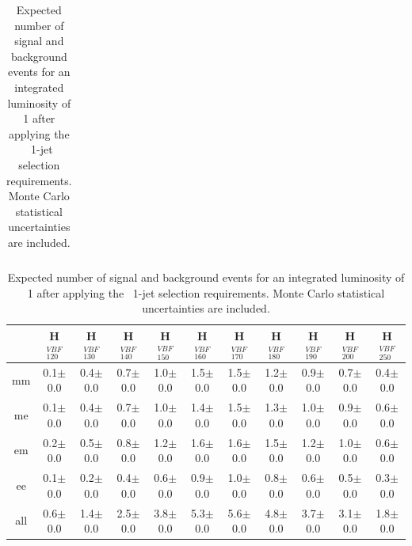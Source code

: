 \begin{table}[!ht]
\begin{center}
{\begin{tabular} {|c|c|c|c|c|c|c|c|c|c|c|}
 \hline
  \end{tabular}
  }
 {\small
  \begin{tabular} {|c|c|c|c|c|c|c|c|c|c|c|}
  \hline
     &   H$^{VBF}_{120}$ &  H$^{VBF}_{130}$ &    H$^{VBF}_{140}$ &   H$^{VBF}_{150}$ &   H$^{VBF}_{160}$ &   H$^{VBF}_{170}$ &   H$^{VBF}_{180}$ &   H$^{VBF}_{190}$ &   H$^{VBF}_{200}$ &   H$^{VBF}_{250}$ \\
  \hline
  \hline
  mm &  0.1$\pm$0.0 &  0.4$\pm$0.0 &  0.7$\pm$0.0 &  1.0$\pm$0.0 &  1.5$\pm$0.0 &  1.5$\pm$0.0 &  1.2$\pm$0.0 &  0.9$\pm$0.0 &  0.7$\pm$0.0 &  0.4$\pm$0.0 \\
  me &  0.1$\pm$0.0 &  0.4$\pm$0.0 &  0.7$\pm$0.0 &  1.0$\pm$0.0 &  1.4$\pm$0.0 &  1.5$\pm$0.0 &  1.3$\pm$0.0 &  1.0$\pm$0.0 &  0.9$\pm$0.0 &  0.6$\pm$0.0 \\
  em &  0.2$\pm$0.0 &  0.5$\pm$0.0 &  0.8$\pm$0.0 &  1.2$\pm$0.0 &  1.6$\pm$0.0 &  1.6$\pm$0.0 &  1.5$\pm$0.0 &  1.2$\pm$0.0 &  1.0$\pm$0.0 &  0.6$\pm$0.0 \\
  ee &  0.1$\pm$0.0 &  0.2$\pm$0.0 &  0.4$\pm$0.0 &  0.6$\pm$0.0 &  0.9$\pm$0.0 &  1.0$\pm$0.0 &  0.8$\pm$0.0 &  0.6$\pm$0.0 &  0.5$\pm$0.0 &  0.3$\pm$0.0 \\
  \hline
 all &  0.6$\pm$0.0 &  1.4$\pm$0.0 &  2.5$\pm$0.0 &  3.8$\pm$0.0 &  5.3$\pm$0.0 &  5.6$\pm$0.0 &  4.8$\pm$0.0 &  3.7$\pm$0.0 &  3.1$\pm$0.0 &  1.8$\pm$0.0 \\


 \hline
  \end{tabular}
  }
  \caption{Expected number of signal and background events for an 
  integrated luminosity of 1\ifb{} after 
  applying the \ww\ 1-jet selection requirements. Monte Carlo statistical uncertainties are 
  included.}
   \label{tab:wwselection1}
  \end{center}
\end{table}



